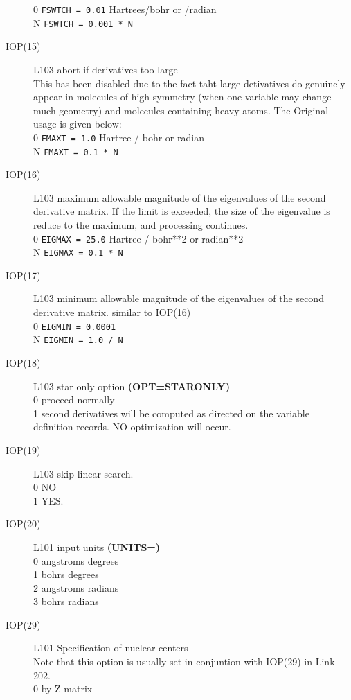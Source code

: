 \begin{description}
0  {\tt FSWTCH = 0.01} Hartrees/bohr or /radian \\
N {\tt FSWTCH = 0.001 * N}
\item[IOP(15)] L103  abort if derivatives too large \\
This has been disabled due to the fact taht large
detivatives do genuinely appear in molecules of high symmetry
(when one variable may change much geometry) and molecules containing
heavy atoms. The Original usage is given below: \\
0  {\tt FMAXT = 1.0} Hartree / bohr or radian \\
N {\tt FMAXT = 0.1 * N}
\item[IOP(16)] L103  maximum allowable magnitude of the eigenvalues of the
second derivative matrix. If the limit is exceeded, the size of
the eigenvalue is reduce to the maximum, and processing
continues. \\
0  {\tt EIGMAX = 25.0} Hartree / bohr**2 or radian**2 \\
N {\tt EIGMAX = 0.1 * N}
\item[IOP(17)] L103 minimum allowable magnitude of the eigenvalues
of the second derivative matrix. similar to IOP(16)  \\
0  {\tt EIGMIN = 0.0001} \\
N {\tt EIGMIN = 1.0 / N}
\item[IOP(18)] L103  star only option {\bf (OPT=STARONLY)}  \\
0  proceed normally \\
1  second derivatives will be computed as directed on the variable \\
definition records. NO optimization will occur. 
\item[IOP(19)] L103  skip linear search.  \\
0  NO \\
1  YES. \\
\item[IOP(20)] L101  input units {\bf (UNITS=)}  \\
0  angstroms degrees \\
1  bohrs  degrees \\
2  angstroms radians \\
3  bohrs  radians \\
\item[IOP(29)] L101  Specification of nuclear centers  \\
Note that this option is usually set in conjuntion with IOP(29)
in Link 202.  \\
0  by Z-matrix \\

\end{description}
